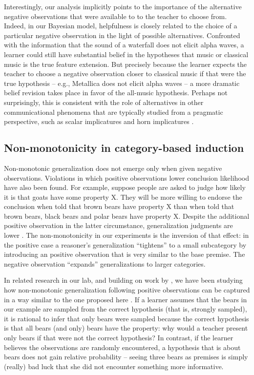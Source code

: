 \documentclass[authoryear,11pt]{elsarticle}
\begin{document}
Interestingly, our analysis implicitly points to the importance of the alternative negative observations that were available to to the teacher to choose from. Indeed, in our Bayesian model, helpfulness is closely related to the choice of a particular negative observation in the light of possible alternatives. Confronted with the information that the sound of a waterfall does not elicit alpha waves, a learner could still have substantial belief in the hypotheses that music or classical music is the true feature extension. But precisely because the learner expects the teacher to choose a negative observation closer to classical music if that were the true hypothesis -- e.g., Metallica does not elicit alpha waves -- a more dramatic belief revision takes place in favor of the all-music hypothesis. Perhaps not surprisingly, this is consistent with the role of alternatives in other communicational phenomena that are typically studied from a pragmatic perspective, such as scalar implicatures and horn implicatures \citep[e.g.][]{Barneretal2011, Bergenetal2012, Chierchiaetal2001, SullivanBarner2011, Stilleretal2011}.

\subsection{Non-monotonicity in category-based induction}

Non-monotonic generalization does not emerge only when given negative observations. Violations in which positive observations lower conclusion likelihood have also been found. For example, suppose people are asked to judge how likely it is that goats have some property X. They will be more willing to endorse the conclusion when told that brown bears have property X than when told that brown bears, black bears and polar bears have property X. Despite the additional positive observation in the latter circumstance, generalization judgments are lower \citep{Medinetal2003}. The non-monotonicity in our experiments is the inversion of that effect: in the positive case a reasoner's generalization ``tightens'' to a small subcategory by introducing an positive observation that is very similar to the base premise. The negative observation ``expands'' generalizations to larger categories.

In related research in our lab, and building on work by \citet{Fernbach2006}, we have been studying how non-monotonic generalization following positive observations can be captured in a way similar to the one proposed here \citep{Ransometalsubmitted}. If a learner assumes that the bears in our example are sampled from the correct hypothesis (that is, strongly sampled), it is rational to infer that only bears were sampled because the correct hypothesis is that all bears (and only) bears have the property: why would a teacher present only bears if that were not the correct hypothesis? In contrast, if the learner believes the observations are randomly encountered, a hypothesis that is about bears does not gain relative probability -- seeing three bears as premises is simply (really) bad luck that she did not encounter something more informative.
\end{document}

